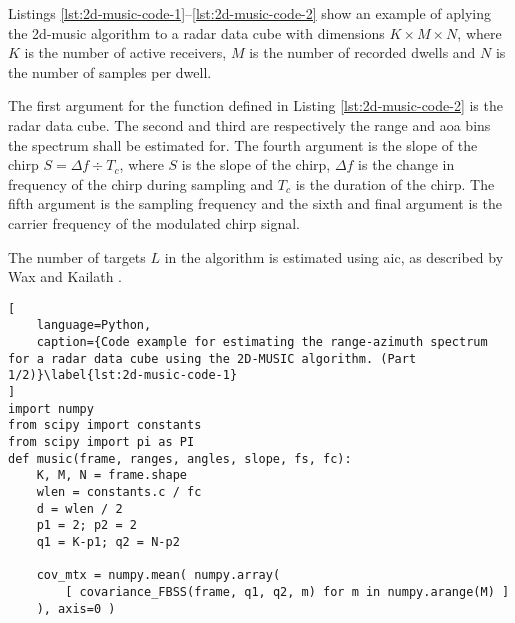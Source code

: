 Listings \ref{lst:2d-music-code-1}--\ref{lst:2d-music-code-2} show an example of aplying the \gls{2d-music} algorithm to a radar data cube
with dimensions $K \times M \times N$, where $K$ is the number of active receivers, 
$M$ is the number of recorded dwells and $N$ is the number of samples per dwell.

The first argument for the function defined in Listing \ref{lst:2d-music-code-2} is the radar data cube.
The second and third are respectively the range and \gls{aoa} bins the spectrum shall be estimated for.
The fourth argument is the slope of the chirp $S = \Delta f \div T_c$, where $S$ is the slope of the chirp,
$\Delta f$ is the change in frequency of the chirp during sampling and $T_c$ is the duration of the chirp.
The fifth argument is the sampling frequency and the sixth and final argument is the carrier frequency of the modulated chirp signal.

The number of targets $L$ in the algorithm is estimated using \gls{aic}, as described by Wax and Kailath \cite{wax-kailath-85}.

\begin{lstlisting}[
    language=Python,
    caption={Code example for estimating the range-azimuth spectrum for a radar data cube using the 2D-MUSIC algorithm. (Part 1/2)}\label{lst:2d-music-code-1}
]
import numpy
from scipy import constants
from scipy import pi as PI
def music(frame, ranges, angles, slope, fs, fc):
    K, M, N = frame.shape
    wlen = constants.c / fc
    d = wlen / 2
    p1 = 2; p2 = 2
    q1 = K-p1; q2 = N-p2

    cov_mtx = numpy.mean( numpy.array(
        [ covariance_FBSS(frame, q1, q2, m) for m in numpy.arange(M) ]
    ), axis=0 )
\end{lstlisting}
\newpage

